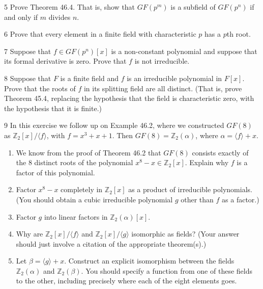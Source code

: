 \begin{problem}{5}
    Prove Theorem 46.4. That is, show that $GF(p^m)$ is a subfield of $GF(p^n)$ if and only
    if $m$ divides $n$.
\end{problem}
\unsolved

\begin{problem}{6}
    Prove that every element in a finite field with characteristic $p$ has a $p$th root.
\end{problem}
\unsolved

\begin{problem}{7}
    Suppose that $f \in GF(p^n)[x]$ is a non-constant polynomial and suppose that its
    formal derivative is zero. Prove that $f$ is not irreducible.
\end{problem}
\unsolved

\begin{problem}{8}
    Suppose that $F$ is a finite field and $f$ is an irreducible polynomial in $F[x]$.
    Prove that the roots of $f$ in its splitting field are all distinct. (That is, prove
    Theorem 45.4, replacing the hypothesis that the field is characteristic zero, with the
    hypothesis that it is finite.)
\end{problem}
\unsolved

\begin{problem}{9}
    In this exercise we follow up on Example 46.2, where we constructed $GF(8)$ as
    $\mathbb{Z}_2[x]/\langle f \rangle$, with $f = x^3 + x + 1$. Then
    $GF(8) = \mathbb{Z}_2(\alpha)$, where $\alpha = \langle f \rangle + x$.
    \begin{enumerate}
        \item[(a)] We know from the proof of Theorem 46.2 that $GF(8)$ consists exactly of
        the 8 distinct roots of the polynomial $x^8 - x \in \mathbb{Z}_2[x]$. Explain why
        $f$ is a factor of this polynomial.
        \item[(b)] Factor $x^8 - x$ completely in $\mathbb{Z}_2[x]$ as a product of
        irreducible polynomials. (You should obtain a cubic irreducible polynomial $g$
        other than $f$ as a factor.)
        \item[(c)] Factor $g$ into linear factors in $\mathbb{Z}_2(\alpha)[x]$.
        \item[(d)] Why are $\mathbb{Z}_2[x]/\langle f \rangle$ and
        $\mathbb{Z}_2[x]/\langle g \rangle$ isomorphic as fields? (Your answer should just
        involve a citation of the appropriate theorem(s).)
        \item[(e)] Let $\beta = \langle g \rangle + x$. Construct an explicit isomorphism
        between the fields $\mathbb{Z}_2(\alpha)$ and $\mathbb{Z}_2(\beta)$. You should
        specify a function from one of these fields to the other, including precisely
        where each of the eight elements goes.
    \end{enumerate}
\end{problem}
\unsolved

